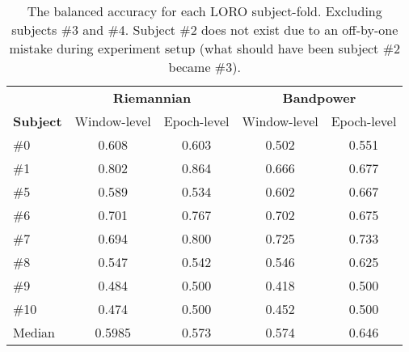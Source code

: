 \begin{table}[h]
    \centering
    \begin{tabular}{lcccc}
        \toprule
        & \multicolumn{2}{c}{\textbf{Riemannian}} & \multicolumn{2}{c}{\textbf{Bandpower}} \\
        \cmidrule(lr){2-3}
        \cmidrule(lr){4-5}
        \textbf{Subject} & Window-level & Epoch-level & Window-level & Epoch-level \\
        \midrule
        \#0  & 0.608 & 0.603 & 0.502 & 0.551 \\
        \#1  & 0.802 & 0.864 & 0.666 & 0.677 \\
        \#5  & 0.589 & 0.534 & 0.602 & 0.667 \\
        \#6  & 0.701 & 0.767 & 0.702 & 0.675 \\
        \#7  & 0.694 & 0.800 & 0.725 & 0.733 \\
        \#8  & 0.547 & 0.542 & 0.546 & 0.625 \\
        \#9  & 0.484 & 0.500 & 0.418 & 0.500 \\
        \#10 & 0.474 & 0.500 & 0.452 & 0.500 \\
        \midrule
        Median & 0.5985 & 0.573 & 0.574 & 0.646 \\
        \bottomrule
    \end{tabular}
    \caption{The balanced accuracy for each LORO subject-fold. Excluding subjects \#3 and \#4. Subject \#2 does not exist due to an off-by-one mistake during experiment setup (what should have been subject \#2 became \#3).}\label{table:bac-all}
\end{table}
